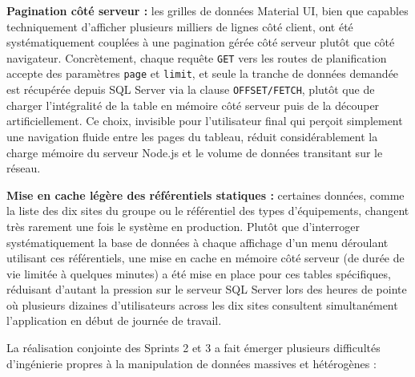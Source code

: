 \textbf{Pagination côté serveur :} les grilles de données Material UI, bien que capables techniquement d'afficher plusieurs milliers de lignes côté client, ont été systématiquement couplées à une pagination gérée côté serveur plutôt que côté navigateur. Concrètement, chaque requête \texttt{GET} vers les routes de planification accepte des paramètres \texttt{page} et \texttt{limit}, et seule la tranche de données demandée est récupérée depuis SQL Server via la clause \texttt{OFFSET/FETCH}, plutôt que de charger l'intégralité de la table en mémoire côté serveur puis de la découper artificiellement. Ce choix, invisible pour l'utilisateur final qui perçoit simplement une navigation fluide entre les pages du tableau, réduit considérablement la charge mémoire du serveur Node.js et le volume de données transitant sur le réseau.

\textbf{Mise en cache légère des référentiels statiques :} certaines données, comme la liste des dix sites du groupe ou le référentiel des types d'équipements, changent très rarement une fois le système en production. Plutôt que d'interroger systématiquement la base de données à chaque affichage d'un menu déroulant utilisant ces référentiels, une mise en cache en mémoire côté serveur (de durée de vie limitée à quelques minutes) a été mise en place pour ces tables spécifiques, réduisant d'autant la pression sur le serveur SQL Server lors des heures de pointe où plusieurs dizaines d'utilisateurs across les dix sites consultent simultanément l'application en début de journée de travail.


La réalisation conjointe des Sprints 2 et 3 a fait émerger plusieurs difficultés d'ingénierie propres à la manipulation de données massives et hétérogènes :

